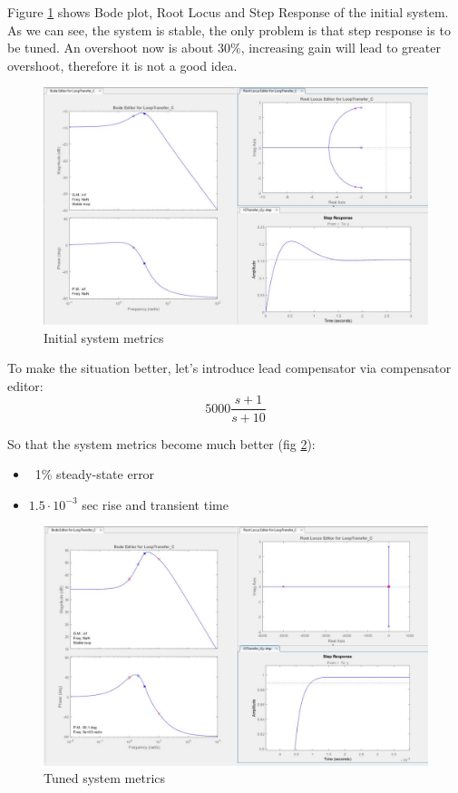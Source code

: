 \documentclass[12pt,letterpaper]{article}
\begin{document}
    Figure \ref{fig:initial_metrics} shows Bode plot, Root Locus and Step Response of the initial system. As we can see, the system is stable, the only problem is that step response is to be tuned. An overshoot now is about $30\%$, increasing gain will lead to greater overshoot, therefore it is not a good idea.
    \begin{figure}[H]
        \centering
        \includegraphics[width=16cm]{images/output/sys_init.jpg}
        \caption{Initial system metrics}
        \label{fig:initial_metrics}
    \end{figure}

    To make the situation better, let's introduce lead compensator via compensator editor:        
    \begin{equation*}
        5000\frac{s+1}{s+10}
    \end{equation*}
    
    So that the system metrics become much better (fig \ref{fig:tuned_metrics}):
    \begin{itemize}
        \item ~1\% steady-state error
        \item $1.5 \cdot 10 ^ {-3}$ sec rise and transient time
    \end{itemize}
    \begin{figure}[H]
        \centering
        \includegraphics[width=16cm]{images/output/sys_tuned.jpg}
        \caption{Tuned system metrics}
        \label{fig:tuned_metrics}
    \end{figure}
    
\end{document}
